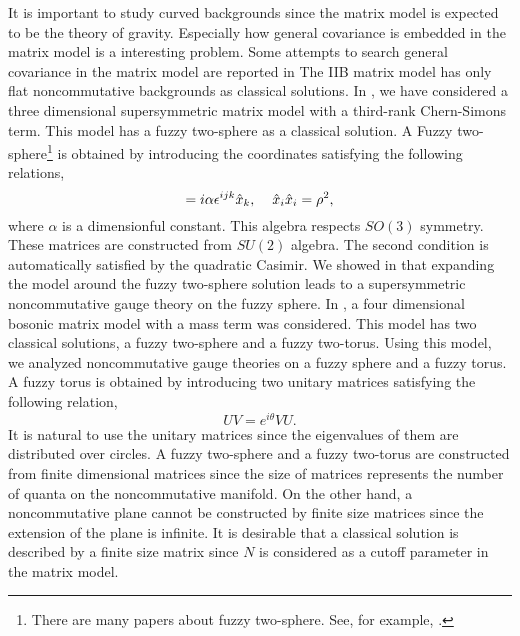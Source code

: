 \documentclass[a4paper,11pt]{article}
\begin{document}
It is important to study curved backgrounds 
since the matrix model is expected to be the theory of gravity. 
Especially how general covariance is embedded in the 
matrix model is a interesting problem. 
Some attempts to search general covariance in the matrix model 
are reported in \cite{IK,AIKO,azumakawai}
The IIB matrix model has only flat noncommutative  
backgrounds as classical solutions. 
In \cite{IKTW}, 
we have considered 
a three dimensional supersymmetric matrix model with 
a third-rank Chern-Simons term.  
This model has a fuzzy two-sphere as a classical solution. 
A Fuzzy two-sphere\footnote{
There are many papers about fuzzy two-sphere. 
See, for example, \cite{madore}.} 
is obtained by introducing the coordinates 
satisfying the following relations, 
\begin{equation}
[\hat{x}_{i},\hat{x}_{j}]=i\alpha\epsilon^{ijk}\hat{x}_{k}, 
\hspace{0.4cm}\hat{x}_{i}\hat{x}_{i}=\rho^{2}, 
\label{fuzzytwosphere}
\end{equation}
where $\alpha$ is a dimensionful constant. 
This algebra respects $SO(3)$ symmetry. 
These matrices are constructed from $SU(2)$ algebra. 
The second condition is automatically satisfied 
by the quadratic Casimir. 
We showed in \cite{IKTW} that expanding the model around 
the fuzzy two-sphere solution leads to a 
supersymmetric noncommutative 
gauge theory on the fuzzy sphere. 
In \cite{yk2}, a four dimensional 
bosonic matrix model with a mass term  
was considered. 
This model has two classical solutions, a fuzzy two-sphere and 
a fuzzy two-torus. 
Using this model, we analyzed noncommutative 
gauge theories on a fuzzy sphere and a fuzzy torus. 
A fuzzy torus is obtained by introducing two 
unitary matrices 
satisfying the following relation, 
\begin{equation}
UV=e^{i\theta}VU.  
\end{equation}
It is natural to use the unitary matrices since 
the eigenvalues of them are distributed over circles. 
A fuzzy two-sphere and a fuzzy two-torus are constructed 
from finite dimensional matrices since the size of matrices 
represents the number of quanta on the noncommutative manifold. 
On the other hand, a noncommutative plane cannot be constructed 
by finite size matrices since 
the extension of the plane is infinite. 
It is desirable that a classical solution 
is described by a finite size matrix since $N$ is considered as 
a cutoff parameter in the matrix model. 
\end{document}
